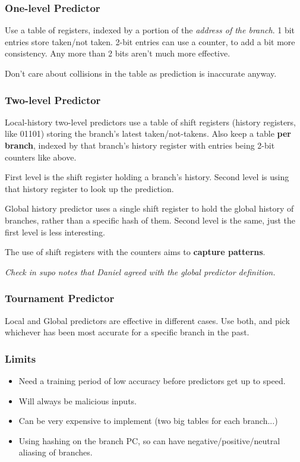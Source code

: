\documentclass[a4paper, 11pt]{article}
\begin{document}
{{        \subsubsection*{One-level Predictor}
        {
            Use a table of registers, indexed by a portion of the \textit{address of the branch}. 1 bit entries store taken/not taken. 2-bit entries can use a counter, to add a bit more consistency. Any more than 2 bits aren't much more effective.

            Don't care about collisions in the table as prediction is inaccurate anyway.
        }
        \subsubsection*{Two-level Predictor}
        {
            Local-history two-level predictors use a table of shift registers (history registers, like 01101) storing the branch's latest taken/not-takens. Also keep a table \textbf{per branch}, indexed by that branch's history register with entries being 2-bit counters like above.

            First level is the shift register holding a branch's history. Second level is using that history register to look up the prediction.

            Global history predictor uses a single shift register to hold the global history of branches, rather than a specific hash of them. Second level is the same, just the first level is less interesting.

            The use of shift registers with the counters aims to \textbf{capture patterns}.

            \textit{Check in supo notes that Daniel agreed with the global predictor definition.}
        }
        \subsubsection*{Tournament Predictor}
        {
            Local and Global predictors are effective in different cases. Use both, and pick whichever has been most accurate for a specific branch in the past.
        }
        \subsubsection*{Limits}
        {
            \begin{itemize}
            \item Need a training period of low accuracy before predictors get up to speed.
            \item Will always be malicious inputs.
            \item Can be very expensive to implement (two big tables for each branch...)
            \item Using hashing on the branch PC, so can have negative/positive/neutral aliasing of branches.
            \end{itemize}
        }
}}
\end{document}
